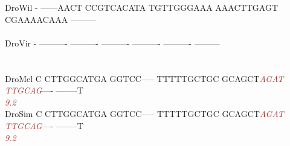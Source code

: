 \documentclass[11pt,twoside,reqno,a4paper]{article}
\begin{document}
{DroWil	-	------AACT	CCGTCACATA	TGTTGGGAAA	AAACTTGAGT	CGAAAACAAA	---------\\
\hspace*{7\charwidth}\hspace*{1\charwidth}\hspace*{1\charwidth}\hspace*{1\charwidth}\hspace*{1\charwidth}\hspace*{1\charwidth}\hspace*{1\charwidth}\\
DroVir	-	----------	----------	----------	----------	----------	---------\\
\hspace*{7\charwidth}\hspace*{1\charwidth}\hspace*{1\charwidth}\hspace*{1\charwidth}\hspace*{1\charwidth}\hspace*{1\charwidth}\hspace*{1\charwidth}\\
\\
DroMel	C	CTTGGCATGA	GGTCC-----	TTTTTGCTGC	GCAGCT\textit{\textcolor{Brown}{A}}\textit{\textcolor{Brown}{G}}\textit{\textcolor{Brown}{A}}\textit{\textcolor{Brown}{T}}	\textit{\textcolor{Brown}{T}}\textit{\textcolor{Brown}{T}}\textit{\textcolor{Brown}{G}}\textit{\textcolor{Brown}{C}}\textit{\textcolor{Brown}{A}}\textit{\textcolor{Brown}{G}}----	--------T\\
\hspace*{7\charwidth}\hspace*{1\charwidth}\hspace*{1\charwidth}\hspace*{1\charwidth}\hspace*{1\charwidth}\hspace*{37\charwidth}\textit{\textcolor{Brown}{9.2}}\hspace*{1\charwidth}\hspace*{1\charwidth}\\
DroSim	C	CTTGGCATGA	GGTCC-----	TTTTTGCTGC	GCAGCT\textit{\textcolor{Brown}{A}}\textit{\textcolor{Brown}{G}}\textit{\textcolor{Brown}{A}}\textit{\textcolor{Brown}{T}}	\textit{\textcolor{Brown}{T}}\textit{\textcolor{Brown}{T}}\textit{\textcolor{Brown}{G}}\textit{\textcolor{Brown}{C}}\textit{\textcolor{Brown}{A}}\textit{\textcolor{Brown}{G}}----	--------T\\
\hspace*{7\charwidth}\hspace*{1\charwidth}\hspace*{1\charwidth}\hspace*{1\charwidth}\hspace*{1\charwidth}\hspace*{37\charwidth}\textit{\textcolor{Brown}{9.2}}\hspace*{1\charwidth}\hspace*{1\charwidth}\\
}
\end{document}
